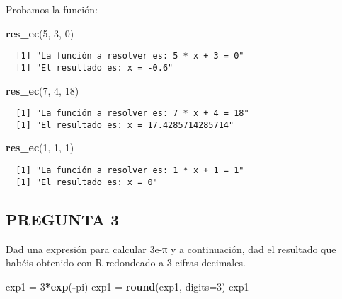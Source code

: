 \documentclass[]{article}
\newenvironment{Shaded}{\begin{snugshade}}{\end{snugshade}}
\newcommand{\DataTypeTok}[1]{\textcolor[rgb]{0.13,0.29,0.53}{#1}}
\newcommand{\DecValTok}[1]{\textcolor[rgb]{0.00,0.00,0.81}{#1}}
\newcommand{\KeywordTok}[1]{\textcolor[rgb]{0.13,0.29,0.53}{\textbf{#1}}}
\newcommand{\NormalTok}[1]{#1}
\newcommand{\OperatorTok}[1]{\textcolor[rgb]{0.81,0.36,0.00}{\textbf{#1}}}
\newcommand{\StringTok}[1]{\textcolor[rgb]{0.31,0.60,0.02}{#1}}
\begin{document}
Probamos la función:

\begin{Shaded}
\begin{Highlighting}[]
\KeywordTok{res_ec}\NormalTok{(}\DecValTok{5}\NormalTok{, }\DecValTok{3}\NormalTok{, }\DecValTok{0}\NormalTok{)}
\end{Highlighting}
\end{Shaded}

\begin{verbatim}
  [1] "La función a resolver es: 5 * x + 3 = 0"
  [1] "El resultado es: x = -0.6"
\end{verbatim}

\begin{Shaded}
\begin{Highlighting}[]
\KeywordTok{res_ec}\NormalTok{(}\DecValTok{7}\NormalTok{, }\DecValTok{4}\NormalTok{, }\DecValTok{18}\NormalTok{)}
\end{Highlighting}
\end{Shaded}

\begin{verbatim}
  [1] "La función a resolver es: 7 * x + 4 = 18"
  [1] "El resultado es: x = 17.4285714285714"
\end{verbatim}

\begin{Shaded}
\begin{Highlighting}[]
\KeywordTok{res_ec}\NormalTok{(}\DecValTok{1}\NormalTok{, }\DecValTok{1}\NormalTok{, }\DecValTok{1}\NormalTok{)}
\end{Highlighting}
\end{Shaded}

\begin{verbatim}
  [1] "La función a resolver es: 1 * x + 1 = 1"
  [1] "El resultado es: x = 0"
\end{verbatim}

\hypertarget{pregunta-3}{%
\subsection{PREGUNTA 3}\label{pregunta-3}}

Dad una expresión para calcular 3e-π y a continuación, dad el resultado
que habéis obtenido con R redondeado a 3 cifras decimales.

\begin{Shaded}
\begin{Highlighting}[]
\NormalTok{exp1 =}\StringTok{ }\DecValTok{3}\OperatorTok{*}\KeywordTok{exp}\NormalTok{(}\OperatorTok{-}\NormalTok{pi)}
\NormalTok{exp1 =}\StringTok{ }\KeywordTok{round}\NormalTok{(exp1, }\DataTypeTok{digits=}\DecValTok{3}\NormalTok{)}
\NormalTok{exp1}
\end{Highlighting}
\end{Shaded}
\end{document}

